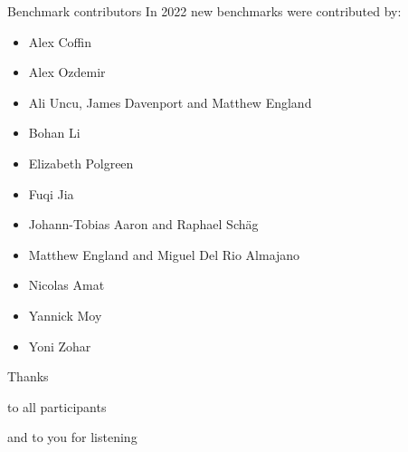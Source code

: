 \documentclass[table]{beamer}
\def\emph#1{\textcolor{MYblue}{#1}}
\begin{document}
\begin{frame}[shrink=0.95]{Benchmark contributors}
  In 2022 \emph{new benchmarks} were contributed by:

  \small
  \begin{itemize}
    \item  Alex Coffin
    \item  Alex Ozdemir
    \item  Ali Uncu, James Davenport and Matthew England
    \item  Bohan Li
    \item  Elizabeth Polgreen
    \item  Fuqi Jia
    \item  Johann-Tobias Aaron and Raphael Schäg
    \item  Matthew England and Miguel Del Rio Almajano
    \item  Nicolas Amat
    \item  Yannick Moy
    \item  Yoni Zohar
  \end{itemize}
\end{frame}

\begin{frame}

  \begin{center}
    \Large\emph{Thanks}
  \end{center}

  \begin{center}
    to all participants
  \end{center}

  \bigskip
  \pause


  \begin{center}
    and to you for listening
  \end{center}

\end{frame}
\end{document}
